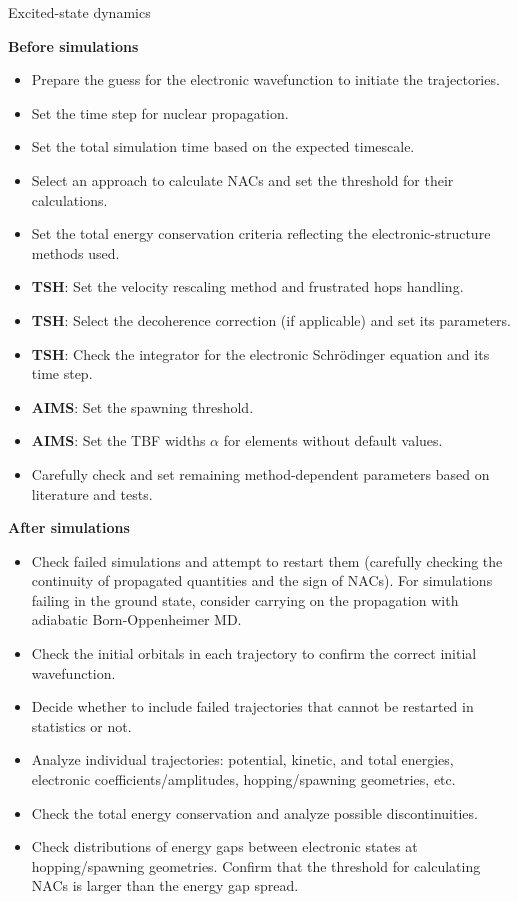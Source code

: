 \documentclass[9pt,bestpractices]{livecoms}
\begin{document}
\clearpage
\begin{Checklists*}[p!]

\begin{checklist}{Excited-state dynamics}

\textbf{Before simulations}
\begin{itemize}
    \item Prepare the guess for the electronic wavefunction to initiate the trajectories.
    \item Set the time step for nuclear propagation. 
    \item Set the total simulation time based on the expected timescale. 
    \item Select an approach to calculate NACs and set the threshold for their calculations. 
    \item Set the total energy conservation criteria reflecting the electronic-structure methods used. 
    \item \textbf{TSH}: Set the velocity rescaling method and frustrated hops handling.
    \item \textbf{TSH}: Select the decoherence correction (if applicable) and set its parameters.
    \item \textbf{TSH}: Check the integrator for the electronic Schrödinger equation and its time step. 
    \item \textbf{AIMS}: Set the spawning threshold.
    \item \textbf{AIMS}: Set the TBF widths $\alpha$ for elements without default values.
    \item Carefully check and set remaining method-dependent parameters based on literature and tests.
\end{itemize}

\textbf{After simulations}
\begin{itemize}
    \item Check failed simulations and attempt to restart them (carefully checking the continuity of propagated quantities and the sign of NACs). For simulations failing in the ground state, consider carrying on the propagation with adiabatic Born-Oppenheimer MD. 
    \item Check the initial orbitals in each trajectory to confirm the correct initial wavefunction.
    \item Decide whether to include failed trajectories that cannot be restarted in statistics or not.
    \item Analyze individual trajectories: potential, kinetic, and total energies, electronic coefficients/amplitudes, hopping/spawning geometries, etc.
    \item Check the total energy conservation and analyze possible discontinuities.
    \item Check distributions of energy gaps between electronic states at hopping/spawning geometries. Confirm that the threshold for calculating NACs is larger than the energy gap spread.
\end{itemize}


\end{checklist}
\end{Checklists*}
\end{document}
